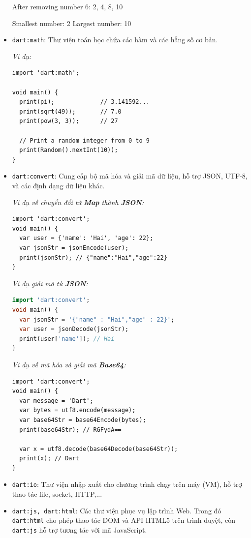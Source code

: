 \documentclass[../DoAn.tex]{subfiles}
\numberwithin{figure}{chapter}
\begin{document}
\begin{itemize}
\begin{myverbatim}
After removing number 6:
{2, 4, 8, 10}

Smallest number: 2
Largest number: 10
\end{myverbatim}
\item \texttt{dart:math}: Thư viện toán học chứa các hàm và các hằng số cơ bản.

\textit{Ví dụ:}

\begin{lstlisting}
import 'dart:math';

void main() {
  print(pi);             // 3.141592...
  print(sqrt(49));       // 7.0
  print(pow(3, 3));      // 27

  // Print a random integer from 0 to 9
  print(Random().nextInt(10)); 
}
\end{lstlisting}

\item \texttt{dart:convert}: Cung cấp bộ mã hóa và giải mã dữ liệu, hỗ trợ JSON, UTF-8, và các định dạng dữ liệu khác.

\textit{Ví dụ về chuyển đổi từ \textbf{Map} thành \textbf{JSON}:}
\begin{lstlisting}
import 'dart:convert';
void main() {
  var user = {'name': 'Hai', 'age': 22};
  var jsonStr = jsonEncode(user);
  print(jsonStr); // {"name":"Hai","age":22}
}
\end{lstlisting}

\textit{Ví dụ giải mã từ \textbf{JSON}:}

\begin{lstlisting}[language=Dart]
import 'dart:convert';
void main() {
  var jsonStr = '{"name" : "Hai","age" : 22}';
  var user = jsonDecode(jsonStr);
  print(user['name']); // Hai
}
\end{lstlisting}

\textit{Ví dụ về mã hóa và giải mã \textbf{Base64}:}
\begin{lstlisting}
import 'dart:convert';
void main() {
  var message = 'Dart';
  var bytes = utf8.encode(message);
  var base64Str = base64Encode(bytes);
  print(base64Str); // RGFydA==

  var x = utf8.decode(base64Decode(base64Str));
  print(x); // Dart
}
\end{lstlisting}

\item \texttt{dart:io}: Thư viện nhập xuất cho chương trình chạy trên máy (VM), hỗ trợ thao tác file, socket, HTTP,...

\item \texttt{dart:js, dart:html}: Các thư viện phục vụ lập trình Web. Trong đó \texttt{dart:html} cho phép thao tác DOM và API HTML5 trên trình duyệt, còn \texttt{dart:js} hỗ trợ tương tác với mã JavaScript.
\end{itemize}
\end{document}

